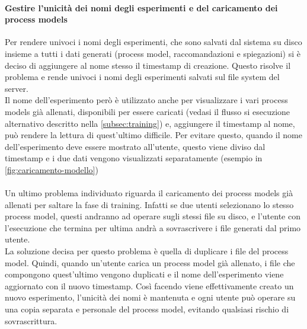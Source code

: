 \paragraph{Gestire l'unicità dei nomi degli esperimenti e del caricamento dei process models}
Per rendere univoci i nomi degli esperimenti, che sono salvati dal sistema su disco insieme a tutti i dati generati (process model, raccomandazioni e spiegazioni) si è deciso di aggiungere al nome stesso il timestamp di creazione. Questo risolve il problema e rende univoci i nomi degli esperimenti salvati sul file system del server.
\\
Il nome dell'esperimento però è utilizzato anche per visualizzare i vari process models già allenati, disponibili per essere caricati (vedasi il flusso si esecuzione alternativo descritto nella \autoref{subsec:training}) e, aggiungere il timestamp al nome, può rendere la lettura di quest'ultimo difficile.
Per evitare questo, quando il nome dell'esperimento deve essere mostrato all'utente, questo viene diviso dal timestamp e i due dati vengono visualizzati separatamente (esempio in \autoref{fig:caricamento-modello})
\\ \\
Un ultimo problema individuato riguarda il caricamento dei process models già allenati per saltare la fase di training. Infatti se due utenti selezionano lo stesso process model, questi andranno ad operare sugli stessi file su disco, e l'utente con l'esecuzione che termina per ultima andrà a sovrascrivere i file generati dal primo utente. \\
La soluzione decisa per questo problema è quella di duplicare i file del process model. Quindi, quando un'utente carica un process model già allenato, i file che compongono quest'ultimo vengono duplicati e il nome dell'esperimento viene aggiornato con il nuovo timestamp. Così facendo viene effettivamente creato un nuovo esperimento, l'unicità dei nomi è mantenuta e ogni utente può operare su una copia separata e personale del process model, evitando qualsiasi rischio di sovrascrittura.


 
